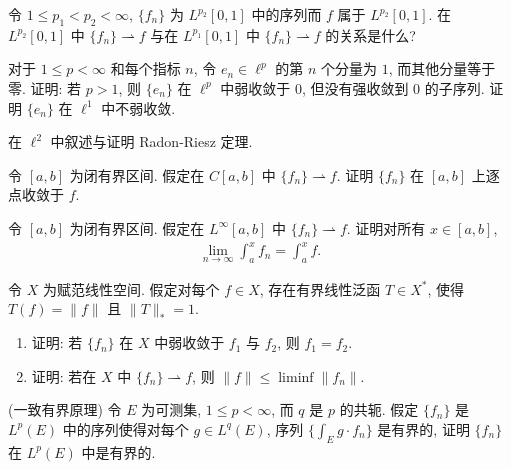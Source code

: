 \documentclass[../../main.tex]{subfiles}
\begin{document}
\begin{exercise}\label{exercise:ch08-20}
令 $1\leqslant p_{1}<p_{2}<\infty$, $\{f_{n}\}$ 为 $L^{p_{2}}[0,1]$ 中的序列而 $f$ 属于 $L^{p_{2}}[0,1]$. 在 $L^{p_{2}}[0,1]$ 中 $\{f_{n}\}\rightharpoonup f$ 与在 $L^{p_{1}}[0,1]$ 中 $\{f_{n}\}\rightharpoonup f$ 的关系是什么?
\end{exercise}

\begin{exercise}\label{exercise:ch08-21}
对于 $1\leqslant p<\infty$ 和每个指标 $n$, 令 $e_{n}\in\ell^{p}$ 的第 $n$ 个分量为 $1$, 而其他分量等于零. 证明: 若 $p>1$, 则 $\{e_{n}\}$ 在 $\ell^{p}$ 中弱收敛于 $0$, 但没有强收敛到 $0$ 的子序列. 证明 $\{e_{n}\}$ 在 $\ell^{1}$ 中不弱收敛.
\end{exercise}

\begin{exercise}\label{exercise:ch08-22}
在 $\ell^{2}$ 中叙述与证明 Radon-Riesz 定理.
\end{exercise}

\begin{exercise}\label{exercise:ch08-23}
令 $[a,b]$ 为闭有界区间. 假定在 $C[a,b]$ 中 $\{f_{n}\}\rightharpoonup f$. 证明 $\{f_{n}\}$ 在 $[a,b]$ 上逐点收敛于 $f$.
\end{exercise}

\begin{exercise}\label{exercise:ch08-24}
令 $[a,b]$ 为闭有界区间. 假定在 $L^{\infty}[a,b]$ 中 $\{f_{n}\}\rightharpoonup f$. 证明对所有 $x\in[a,b]$,
\begin{align*}
\lim_{n\to\infty}\int_{a}^{x}f_{n}=\int_{a}^{x}f.
\end{align*}
\end{exercise}

\begin{exercise}\label{exercise:ch08-25}
令 $X$ 为赋范线性空间. 假定对每个 $f\in X$, 存在有界线性泛函 $T\in X^{*}$, 使得 $T(f)=\|f\|$ 且 $\|T\|_{*}=1$.
\begin{enumerate}[(1)]
\item 证明: 若 $\{f_{n}\}$ 在 $X$ 中弱收敛于 $f_{1}$ 与 $f_{2}$, 则 $f_{1}=f_{2}$.
\item 证明: 若在 $X$ 中 $\{f_{n}\}\rightharpoonup f$, 则 $\|f\|\leqslant\liminf\|f_{n}\|$.
\end{enumerate}
\end{exercise}

\begin{exercise}\label{exercise:ch08-26}
(一致有界原理) 令 $E$ 为可测集, $1\leqslant p<\infty$, 而 $q$ 是 $p$ 的共轭. 假定 $\{f_{n}\}$ 是 $L^{p}(E)$ 中的序列使得对每个 $g\in L^{q}(E)$, 序列 $\{\int_{E}g\cdot f_{n}\}$ 是有界的, 证明 $\{f_{n}\}$ 在 $L^{p}(E)$ 中是有界的.
\end{exercise}
\end{document}

